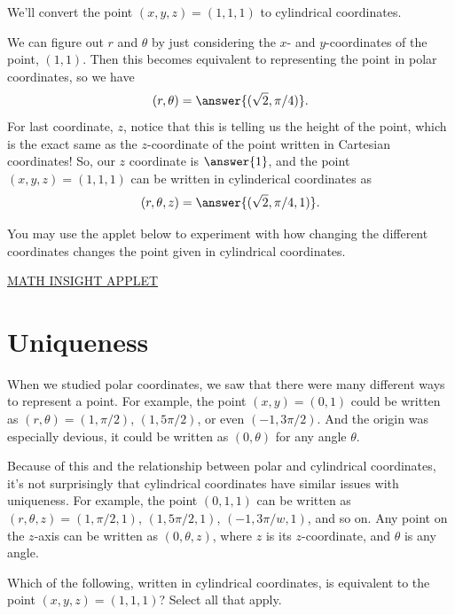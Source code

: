 \documentclass{ximera}
\begin{document}
\begin{example}
We'll convert the point $(x,y,z) = (1,1,1)$ to cylindrical coordinates.

We can figure out $r$ and $\theta$ by just considering the $x$- and $y$-coordinates of the point, $(1,1)$. Then this becomes equivalent to representing the point in polar coordinates, so we have
\[
(r,\theta) = \answer{(\sqrt{2}, \pi/4)}.
\]
For last coordinate, $z$, notice that this is telling us the height of the point, which is the exact same as the $z$-coordinate of the point written in Cartesian coordinates! So, our $z$ coordinate is $\answer{1}$, and the point $(x,y,z) = (1,1,1)$ can be written in cylinderical coordinates as
\[
(r,\theta,z) = \answer{(\sqrt{2}, \pi/4, 1)}.
\]
\end{example}

You may use the applet below to experiment with how changing the different coordinates changes the point given in cylindrical coordinates.

\href{https://mathinsight.org/cylindrical_coordinates}{MATH INSIGHT APPLET}

\section*{Uniqueness}

When we studied polar coordinates, we saw that there were many different ways to represent a point. For example, the point $(x,y) = (0,1)$ could be written as $(r,\theta) = (1,\pi/2)$, $(1,5\pi/2)$, or even $(-1,3\pi/2)$. And the origin was especially devious, it could be written as $(0,\theta)$ for any angle $\theta$.

Because of this and the relationship between polar and cylindrical coordinates, it's not surprisingly that cylindrical coordinates have similar issues with uniqueness. For example, the point $(0,1,1)$ can be written as $(r,\theta, z) = (1,\pi/2,1)$, $(1,5\pi/2,1)$, $(-1, 3\pi/w, 1)$, and so on. Any point on the $z$-axis can be written as $(0,\theta,z)$, where $z$ is its $z$-coordinate, and $\theta$ is any angle.

\begin{problem}
Which of the following, written in cylindrical coordinates, is equivalent to the point $(x,y,z) = (1,1,1)$? Select all that apply.
\begin{selectAll}
\end{selectAll}
\end{problem}
\end{document}
